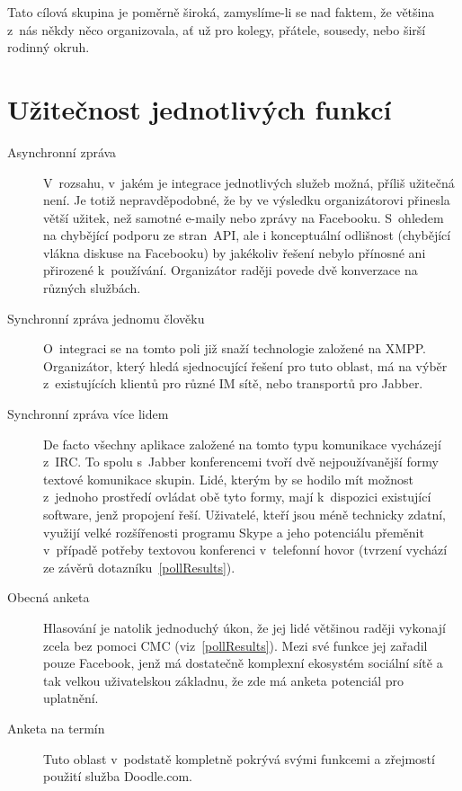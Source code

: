 \documentclass[12pt,oneside,final]{fithesis2}
\begin{document}
Tato cílová skupina je poměrně široká, zamyslíme-li se nad faktem, že většina z~nás někdy něco organizovala, ať už pro kolegy, přátele, sousedy, nebo širší rodinný okruh.


\section{Užitečnost jednotlivých funkcí}\label{utility}
\begin{description}
    \item[Asynchronní zpráva]
        V~rozsahu, v~jakém je integrace jednotlivých služeb možná, příliš užitečná není. Je totiž nepravděpodobné, že by ve výsledku organizátorovi přinesla větší užitek, než samotné e-maily nebo zprávy na Facebooku. S~ohledem na chybějící podporu ze stran~API, ale i konceptuální odlišnost (chybějící vlákna diskuse na Facebooku) by jakékoliv řešení nebylo přínosné ani přirozené k~používání. Organizátor raději povede dvě konverzace na různých službách.

    \item[Synchronní zpráva jednomu člověku]
        O~integraci se na tomto poli již snaží technologie založené na XMPP. Organizátor, který hledá sjednocující řešení pro tuto oblast, má na výběr z~existujících klientů pro různé IM sítě, nebo transportů pro Jabber.

    \item[Synchronní zpráva více lidem]
        De facto všechny aplikace založené na tomto typu komunikace vycházejí z~IRC. To spolu s~Jabber konferencemi tvoří dvě nejpoužívanější formy textové komunikace skupin. Lidé, kterým by se hodilo mít možnost z~jednoho prostředí ovládat obě tyto formy, mají k~dispozici existující software, jenž propojení řeší. Uživatelé, kteří jsou méně technicky zdatní, využijí velké rozšířenosti programu Skype a jeho potenciálu přeměnit v~případě potřeby textovou konferenci v~telefonní hovor (tvrzení vychází ze závěrů dotazníku~\ref{pollResults}).

    \item[Obecná anketa]
        Hlasování je natolik jednoduchý úkon, že jej lidé většinou raději vykonají zcela bez pomoci CMC (viz~\ref{pollResults}). Mezi své funkce jej zařadil pouze Facebook, jenž má dostatečně komplexní ekosystém sociální sítě a tak velkou uživatelskou základnu, že zde má anketa potenciál pro uplatnění.

    \item[Anketa na termín]
        Tuto oblast v~podstatě kompletně pokrývá svými funkcemi a zřejmostí použití služba Doodle.com.


\end{description}
\end{document}

